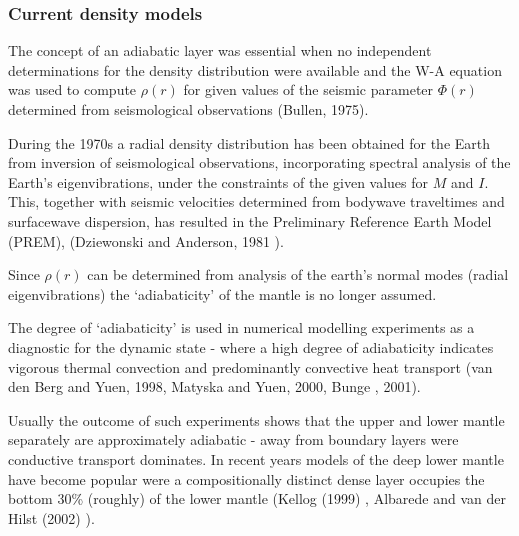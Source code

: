\subsubsection{Current density models}
The concept of an adiabatic layer was essential when no independent
determinations for the density distribution were available and the
W-A equation was used to compute $\rho(r)$ for given values of the
seismic parameter $\Phi(r)$ determined from seismological
observations (Bullen, 1975).

During the 1970s
a radial density distribution has been obtained for the Earth from
inversion of seismological observations,
incorporating spectral analysis of the Earth's eigenvibrations,
under the constraints of the given values for $M$ and $I$. 
This, together with seismic velocities determined from bodywave
traveltimes and surfacewave dispersion, 
has resulted in the Preliminary Reference Earth Model
(PREM), (Dziewonski and Anderson, 1981 \cite{dzan81}).

Since $\rho(r)$ can be determined from analysis of the earth's 
normal modes (radial eigenvibrations) the `adiabaticity' 
of the mantle is no longer assumed.

The degree of `adiabaticity' is used in numerical modelling experiments
as a diagnostic for the dynamic state - where a high degree of 
adiabaticity indicates vigorous thermal convection and predominantly
convective heat transport
(van den Berg and Yuen, 1998, \cite{vayu98}
Matyska and Yuen, 2000, \cite{mayu00}
Bunge \etal, 2001).

Usually the outcome of such experiments shows that the upper and lower
mantle separately are approximately adiabatic - away from boundary
layers were conductive transport dominates.
In recent years models of the deep lower mantle have become
popular were a compositionally distinct dense layer occupies the bottom
30\% (roughly) of the lower mantle 
(Kellog \etal (1999) \cite{kehv99}, Albarede and van der Hilst (2002) \cite{alva02}).


